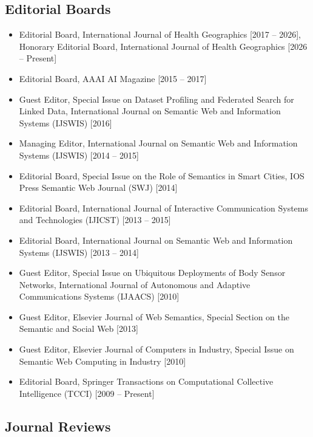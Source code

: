 \documentclass[10pt,a4paper]{res} %
\begin{document}
\begin{resume}
\subsection*{Editorial Boards}
\begin{itemize} \itemsep -2pt
\item Editorial Board, International Journal of Health Geographics [2017 -- 2026], Honorary Editorial Board, International Journal of Health Geographics [2026 -- Present]
\item Editorial Board, AAAI AI Magazine [2015 -- 2017]
\item Guest Editor, Special Issue on Dataset Profiling and Federated Search for Linked Data, International Journal on Semantic Web and Information Systems (IJSWIS) [2016]
\item Managing Editor, International Journal on Semantic Web and Information Systems (IJSWIS) [2014 -- 2015]
\item Editorial Board, Special Issue on the Role of Semantics in Smart Cities, IOS Press Semantic Web Journal (SWJ) [2014]
\item Editorial Board, International Journal of Interactive Communication Systems and Technologies (IJICST) [2013 -- 2015]
\item Editorial Board, International Journal on Semantic Web and Information Systems (IJSWIS) [2013 -- 2014]
\item Guest Editor, Special Issue on Ubiquitous Deployments of Body Sensor Networks, International Journal of Autonomous and Adaptive Communications Systems (IJAACS) [2010]
\item Guest Editor, Elsevier Journal of Web Semantics, Special Section on the Semantic and Social Web [2013]
\item Guest Editor, Elsevier Journal of Computers in Industry, Special Issue on Semantic Web Computing in Industry [2010]
\item Editorial Board, Springer Transactions on Computational Collective Intelligence (TCCI) [2009 -- Present]
\end{itemize}

\subsection*{Journal Reviews}


\end{resume}
\end{document}

